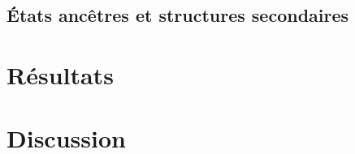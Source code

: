 \documentclass[12pt,a4paper]{report}
\begin{document}
\begin{onehalfspace}
\section*{États ancêtres et structures secondaires}

\chapter*{Résultats}

\chapter*{Discussion}


\end{onehalfspace}


\renewcommand{\thepage}{}
\printglossary[type=\acronymtype ,title=Glossaire]

%

\end{document}
